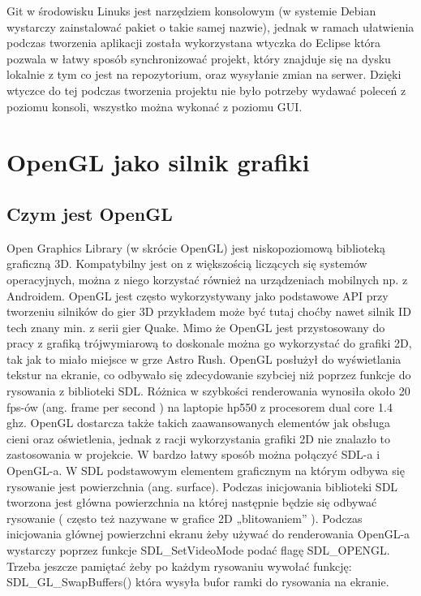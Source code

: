 Git w środowisku Linuks jest narzędziem konsolowym (w systemie Debian wystarczy zainstalować pakiet o takie samej nazwie), jednak w ramach ułatwienia podczas tworzenia aplikacji została wykorzystana wtyczka do Eclipse która pozwala w łatwy sposób synchronizować projekt, który znajduje się na dysku lokalnie z tym co jest na repozytorium, oraz wysyłanie zmian na serwer. Dzięki wtyczce do tej podczas tworzenia projektu nie było potrzeby wydawać poleceń z poziomu konsoli, wszystko można wykonać z poziomu GUI.


\section{OpenGL jako silnik grafiki}

\subsection{Czym jest OpenGL}
Open Graphics Library (w skrócie OpenGL) jest niskopoziomową biblioteką  graficzną 3D. Kompatybilny jest on z większością liczących się systemów
operacyjnych, można z niego korzystać również na urządzeniach mobilnych np. z Androidem. OpenGL jest często wykorzystywany jako podstawowe API przy tworzeniu silników do gier 3D przykładem może
być tutaj choćby nawet silnik ID tech znany min. z serii gier Quake. Mimo że OpenGL jest przystosowany do pracy z grafiką trójwymiarową to doskonale
można go wykorzystać do grafiki 2D, tak jak to miało miejsce w grze Astro Rush. OpenGL posłużył do wyświetlania tekstur na ekranie, co odbywało się
zdecydowanie szybciej niż poprzez funkcje do rysowania z biblioteki SDL.  Różnica w szybkości renderowania wynosiła około 20 fps-ów (ang. frame per second ) na
laptopie hp550 z procesorem dual core 1.4 ghz. OpenGL dostarcza także takich zaawansowanych elementów jak obsługa cieni oraz oświetlenia, jednak z
racji wykorzystania grafiki 2D nie znalazło to zastosowania w projekcie.
	W bardzo łatwy sposób można połączyć SDL-a i OpenGL-a.
W SDL podstawowym elementem graficznym na którym odbywa się rysowanie jest powierzchnia (ang. surface). Podczas inicjowania biblioteki SDL tworzona
jest główna powierzchnia na której następnie będzie się odbywać rysowanie ( często też nazywane w grafice 2D „blitowaniem” ). Podczas inicjowania
głównej powierzchni ekranu żeby używać do renderowania OpenGL-a wystarczy poprzez funkcje SDL\_SetVideoMode podać flagę SDL\_OPENGL. Trzeba jeszcze
pamiętać żeby po każdym rysowaniu wywołać funkcję: SDL\_GL\_SwapBuffers() która wysyła bufor ramki do rysowania na ekranie.


